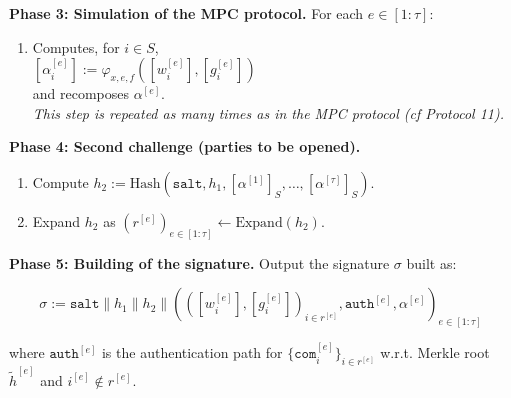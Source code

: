 \documentclass[english]{article}
\begin{document}
\begin{tcolorbox}[title=Protocol 15: Signing Algorithm, breakable, enhanced, colback=white, colframe=black]
			\vspace{0.5em}
			\textbf{Phase 3: Simulation of the MPC protocol.} For each $e \in [1:\tau]$:
			\begin{enumerate}[label=\arabic*.]
				\item Computes, for $i \in S$, \\
				\quad $[\alpha^{[e]}_i] := \varphi_{x,e,f}([w^{[e]}_i], [g^{[e]}_i])$ \\
				and recomposes $\alpha^{[e]}$. \\
				
				\textit{This step is repeated as many times as in the MPC protocol (cf Protocol 11).}
			\end{enumerate}
			
			\vspace{0.5em}
			\textbf{Phase 4: Second challenge (parties to be opened).}
			\begin{enumerate}[label=\arabic*.]
				\item Compute $h_2 := \text{Hash}(\texttt{salt}, h_1, [\alpha^{[1]}]_{S}, \dots, [\alpha^{[\tau]}]_{S})$.
				\item Expand $h_2$ as $(r^{[e]})_{e \in [1:\tau]} \leftarrow \text{Expand}(h_2)$.
			\end{enumerate}
			
			\vspace{0.5em}
			\textbf{Phase 5: Building of the signature.} Output the signature $\sigma$ built as:
			
			\[
			\sigma := \texttt{salt} \parallel h_1 \parallel h_2 \parallel (([w^{[e]}_i], [g^{[e]}_i])_{i \in r^{[e]}}, \texttt{auth}^{[e]}, \alpha^{[e]})_{e \in [1:\tau]}
			\]
			
			where $\texttt{auth}^{[e]}$ is the authentication path for $\{\texttt{com}^{[e]}_i\}_{i \in r^{[e]}}$ w.r.t. Merkle root $\tilde{h}^{[e]}$ and $i^{[e]} \notin r^{[e]}$.
		\end{tcolorbox}
	
\end{document}
